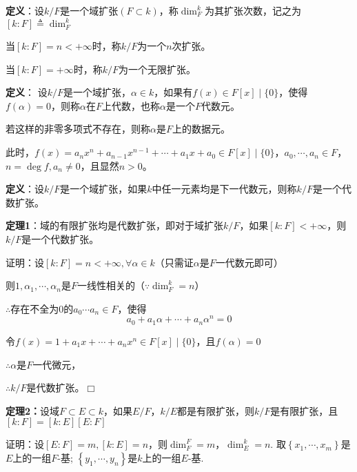\documentclass[UTF8]{article}
\begin{document}
\textbf{定义}：设$k/F$是一个域扩张$(F\subset k)$，称$\operatorname{dim}_F^k$为其扩张次数，记之为$\left[ k: F\right]\triangleq\operatorname{dim}_F^k$

\hspace{11pt}当$\left[ k: F\right]=n<+\infty$时，称$k/F$为一个$n$次扩张。

\hspace{11pt}当$\left[ k: F\right]=+\infty$时，称$k/F$为一个无限扩张。

\textbf{定义}： 设$k/F$是一个域扩张，$\alpha\in k$，如果有$f(x)\in F[x] \mid\{ 0\}$，使得$f(\alpha)=0$，则称$\alpha$在$F$上代数，也称$\alpha$是一个$F$代数元。

若这样的非零多项式不存在，则称$\alpha$是$F$上的数据元。

此时，$f(x)=a_n x^{n}+a_{n-1} x^{n-1}+\cdots+a_{1} x+a_{0}\in F[x] \mid \{ 0\}$，$a_0,\cdots, a_n\in F$，$n=\operatorname{deg}f, a_n\neq 0$，且显然$n>0$。

\textbf{定义}：设$k/F$是一个域扩张，如果$k$中任一元素均是下一代数元，则称$k/F$是一个代数扩张。

\textbf{定理1}：域的有限扩张均是代数扩张，即对于域扩张$k/F$，如果$[k: F]<+\infty$，则$k/F$是一个代数扩张。

证明：设$[k: F]=n<+\infty, \forall\alpha\in k$（只需证$\alpha$是$F$一代数元即可）

\hspace{11pt}则$1,\alpha_1,\cdots,\alpha_n$是$F$一线性相关的（$\because\operatorname{dim}_F^k=n$）

\hspace{11pt}$\therefore$存在不全为0的$a_0\cdots a_n\in F$，使得
$$
a_{0}+a_{1} \alpha+\cdots+a_n\alpha^{n}=0
$$

\hspace{11pt}令$f(x)=1+a_{1} x+\cdots+a_{n} x^{n}  \in  F[x] \mid \{0 \}$，且$f(\alpha)=0$

\hspace{11pt}$\therefore\alpha$是$F$一代微元，

\hspace{11pt}$\therefore k/F$是代数扩张。\hfill$\Box$

\textbf{定理2：}设域$F\subset E\subset k$，如果$E/F$，$k/E$都是有限扩张，则$k/F$是有限扩张，且$[k: F]=[k: E][E: F]$

证明：设$[E: F]=m, [k: E]=n$，则$\operatorname{dim}_F^F=m$，$\operatorname{dim}_E^k=n.$
取$\left\{x_{1}, \cdots, x_{m}\right\}$是$E$上的一组$F$-基;
$\left\{y_{1}, \cdots, y_{n}\right\}$是$k$上的一组$E$-基.
\end{document}
